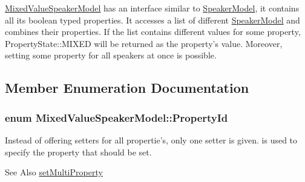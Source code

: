 {\ttfamily \hyperlink{classMixedValueSpeakerModel}{Mixed\-Value\-Speaker\-Model}} has an interface similar to \hyperlink{classSpeakerModel}{Speaker\-Model}, it contains all its boolean typed properties. It accesses a list of different {\ttfamily \hyperlink{classSpeakerModel}{Speaker\-Model}} and combines their properties. If the list contains different values for some property, Property\-State\-::\-M\-I\-X\-E\-D will be returned as the property's value. Moreover, setting some property for all speakers at once is possible. 

\subsection{Member Enumeration Documentation}
\hypertarget{classMixedValueSpeakerModel_a37c5eeb40e2cbb783e862bd46248581e}{
\subsubsection[{Property\-Id}]{\setlength{\rightskip}{0pt plus 5cm}enum {\bf Mixed\-Value\-Speaker\-Model\-::\-Property\-Id}}}\label{classMixedValueSpeakerModel_a37c5eeb40e2cbb783e862bd46248581e}
Instead of offering setters for all propertie's, only one setter is given.  is used to specify the property that should be set. \begin{DoxySeeAlso}{See Also}
\hyperlink{classMixedValueSpeakerModel_a75dca37807957d62e0327ff183abcd31}{set\-Multi\-Property} 
\end{DoxySeeAlso}
